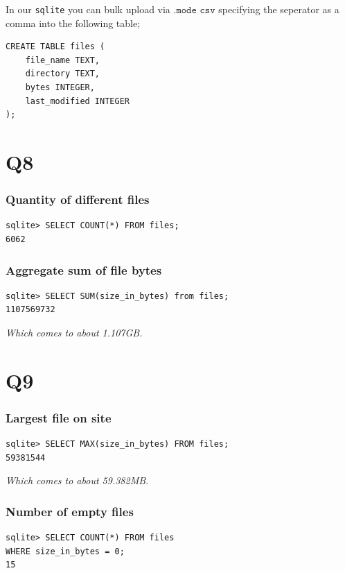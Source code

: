 \documentclass{article}
\begin{document}
In our \texttt{sqlite} you can bulk upload via $\texttt{.mode csv}$ specifying the seperator as a comma into the following table;

\begin{small}
\begin{verbatim}
CREATE TABLE files (
    file_name TEXT,
    directory TEXT,
    bytes INTEGER,
    last_modified INTEGER
);
\end{verbatim}
\end{small}

\section*{Q8}
\subsubsection*{Quantity of different files}
\begin{small}
\begin{verbatim}
sqlite> SELECT COUNT(*) FROM files;                                 
6062
\end{verbatim}
\end{small}

\subsubsection*{Aggregate sum of file bytes}
\begin{small}
\begin{verbatim}
sqlite> SELECT SUM(size_in_bytes) from files;
1107569732
\end{verbatim}
\end{small}
\textit{Which comes to about 1.107GB.}

\section*{Q9}
\subsubsection*{Largest file on site}
\begin{small}
\begin{verbatim}
sqlite> SELECT MAX(size_in_bytes) FROM files;
59381544
\end{verbatim}
\end{small}
\textit{Which comes to about 59.382MB.}

\subsubsection*{Number of empty files}
\begin{small}
\begin{verbatim}
sqlite> SELECT COUNT(*) FROM files
WHERE size_in_bytes = 0;
15
\end{verbatim}
\end{small}
\end{document}
